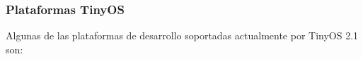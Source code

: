 


\subsubsection{Plataformas TinyOS}
Algunas de las plataformas de desarrollo soportadas actualmente por TinyOS 2.1 son:

